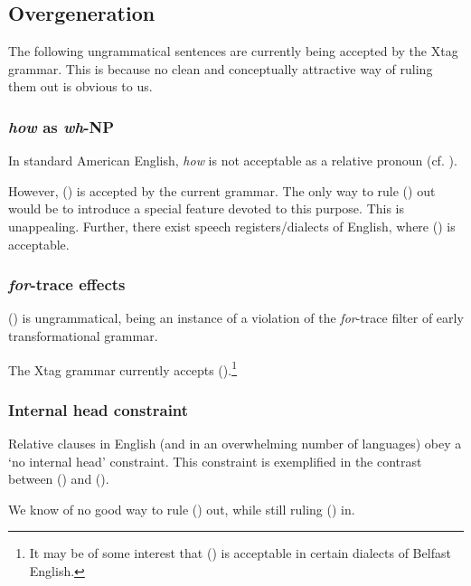 \subsection{Overgeneration}
The following ungrammatical sentences are currently being 
accepted by the Xtag grammar. This is because no clean 
and conceptually attractive way of ruling them out
is obvious to us.

\subsubsection{{\em how} as {\em wh}-NP}
In standard American English, {\em how} is not acceptable as a 
relative pronoun (cf. ).


However, () is accepted by the current grammar.
The only way to rule () out would be to introduce a special feature
devoted to this purpose. This is unappealing. Further, there exist
speech registers/dialects of English, where () is acceptable. 

\subsubsection{{\em for}-trace effects}
() is ungrammatical, being an instance of a violation of the
{\em for}-trace filter of early transformational grammar.


The Xtag grammar currently accepts ().\footnote{It may be of
some interest that () is acceptable in certain dialects of Belfast
English.}


\subsubsection{Internal head constraint}
Relative clauses in English (and in an overwhelming number of languages)
obey a `no internal head' constraint. This constraint is exemplified in
the contrast between () and ().


We know of no good way to rule () out, while still ruling () in.

